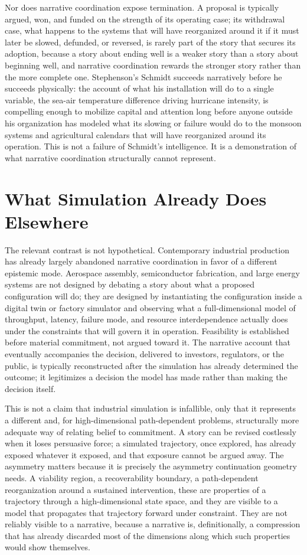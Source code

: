 \documentclass[11pt,oneside]{book}
\begin{document}
Nor does narrative coordination expose termination. A proposal is typically argued, won, and funded on the strength of its operating case; its withdrawal case, what happens to the systems that will have reorganized around it if it must later be slowed, defunded, or reversed, is rarely part of the story that secures its adoption, because a story about ending well is a weaker story than a story about beginning well, and narrative coordination rewards the stronger story rather than the more complete one. Stephenson's Schmidt succeeds narratively before he succeeds physically: the account of what his installation will do to a single variable, the sea-air temperature difference driving hurricane intensity, is compelling enough to mobilize capital and attention long before anyone outside his organization has modeled what its slowing or failure would do to the monsoon systems and agricultural calendars that will have reorganized around its operation. This is not a failure of Schmidt's intelligence. It is a demonstration of what narrative coordination structurally cannot represent.

\section*{What Simulation Already Does Elsewhere}

The relevant contrast is not hypothetical. Contemporary industrial production has already largely abandoned narrative coordination in favor of a different epistemic mode. Aerospace assembly, semiconductor fabrication, and large energy systems are not designed by debating a story about what a proposed configuration will do; they are designed by instantiating the configuration inside a digital twin or factory simulator and observing what a full-dimensional model of throughput, latency, failure mode, and resource interdependence actually does under the constraints that will govern it in operation. Feasibility is established before material commitment, not argued toward it. The narrative account that eventually accompanies the decision, delivered to investors, regulators, or the public, is typically reconstructed after the simulation has already determined the outcome; it legitimizes a decision the model has made rather than making the decision itself.

This is not a claim that industrial simulation is infallible, only that it represents a different and, for high-dimensional path-dependent problems, structurally more adequate way of relating belief to commitment. A story can be revised costlessly when it loses persuasive force; a simulated trajectory, once explored, has already exposed whatever it exposed, and that exposure cannot be argued away. The asymmetry matters because it is precisely the asymmetry continuation geometry needs. A viability region, a recoverability boundary, a path-dependent reorganization around a sustained intervention, these are properties of a trajectory through a high-dimensional state space, and they are visible to a model that propagates that trajectory forward under constraint. They are not reliably visible to a narrative, because a narrative is, definitionally, a compression that has already discarded most of the dimensions along which such properties would show themselves.
\end{document}
